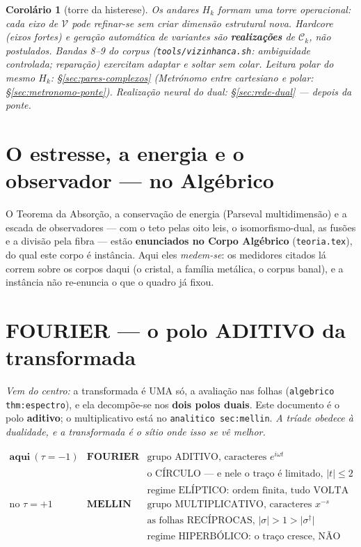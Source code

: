 \documentclass[11pt,a4paper]{article}
\newcommand{\abs}[1]{\lvert #1\rvert}
\newcommand{\dg}{^{\dagger}}
\newtheorem{corolario}{Corolário}
\newcommand{\code}[1]{\texttt{#1}}
\begin{document}
\begin{corolario}[torre da histerese]\label{cor:torre-histerese}
Os andares $H_k$ formam uma torre operacional: cada eixo de $\mathcal{V}$
pode refinar-se sem criar dimensão estrutural nova. Hardcore (eixos
fortes) e geração automática de variantes são \textbf{realizações} de
$\mathcal{C}_k$, não postulados. Bandas 8--9 do corpus
(\code{tools/vizinhanca.sh}: ambiguidade controlada; reparação) exercitam
adaptar e soltar sem colar. Leitura polar do mesmo $H_k$:
\S\ref{sec:pares-complexos} (Metrónomo entre cartesiano e polar:
\S\ref{sec:metronomo-ponte}). Realização neural do dual:
\S\ref{sec:rede-dual} --- depois da ponte.

\end{corolario}

\section{O estresse, a energia e o observador --- no Algébrico}\label{sec:instancia-universal}

O Teorema da Absorção, a conservação de energia (Parseval multidimensão)
e a escada de observadores --- com o teto pelas oito leis, o
isomorfismo-dual, as fusões e a divisão pela fibra --- estão
\textbf{enunciados no Corpo Algébrico} (\code{teoria.tex}),
do qual este corpo é instância. Aqui eles \emph{medem-se}: os medidores
citados lá correm sobre os corpos daqui (o cristal, a família metálica,
o corpus banal), e a instância não re-enuncia o que o quadro já fixou.

\section{FOURIER --- o polo ADITIVO da transformada}\label{sec:fourier}

\noindent\emph{Vem do centro:} a transformada é UMA só, a avaliação nas folhas
(\code{algebrico thm:espectro}), e ela decompõe-se nos \textbf{dois polos duais}. Este
documento é o polo \textbf{aditivo}; o multiplicativo está no
\code{analitico sec:mellin}. \emph{A tríade obedece à dualidade, e a transformada é o
sítio onde isso se vê melhor.}

\[
\boxed{
\begin{array}{lll}
\textbf{aqui} \ (\tau=-1) & \textbf{FOURIER} & \text{grupo ADITIVO, caracteres } e^{i\omega t}\\[2pt]
 & & \text{o CÍRCULO --- e nele o traço é limitado, } \abs{t}\leq2\\[2pt]
 & & \text{regime ELÍPTICO: ordem finita, tudo VOLTA}\\[6pt]
\text{no } \tau=+1 & \textbf{MELLIN} & \text{grupo MULTIPLICATIVO, caracteres } x^{-s}\\[2pt]
 & & \text{as folhas RECÍPROCAS, } \abs{\sigma}>1>\abs{\sigma\dg}\\[2pt]
 & & \text{regime HIPERBÓLICO: o traço cresce, NÃO fecha}
\end{array}}
\]
\end{document}
